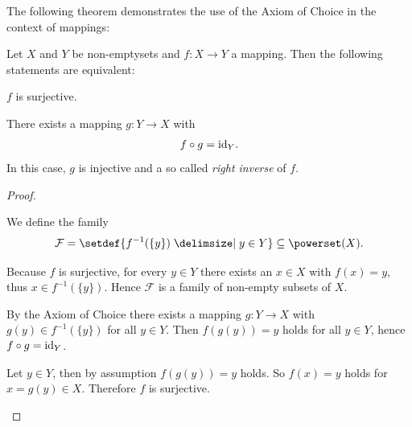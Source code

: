 The following theorem demonstrates the use of the Axiom of Choice in the context of mappings:

\begin{theorem}\label{theorem:mappings:choice_partition}
    Let $X$ and $Y$ be non-emptysets and $f\colon X\rightarrow Y$ a mapping.
    Then the following statements are equivalent:
    \begin{intheoremenumerate}
        \item $f$ is surjective.
        \item There exists a mapping $g\colon Y\rightarrow X$ with \begin{align}f\circ g=\text{id}_Y.\end{align} In this case, $g$ is injective and a so called \emph{right inverse} of $f$.
    \end{intheoremenumerate}
\end{theorem}

\begin{proof}
    \begin{proofenumerate}
         We define the family \begin{align}\mathcal F=\setdef{f^{-1}(\{y\})\given y\in Y}\subseteq\powerset(X).\end{align}
        
         Because $f$ is surjective, for every $y\in Y$ there exists an $x\in X$ with $f(x)=y$, thus $x\in f^{-1}(\{y\})$. Hence $\mathcal F$ is a family of non-empty subsets of $X$.

         By the Axiom of Choice there exists a mapping $g\colon Y\rightarrow X$ with $g(y)\in f^{-1}(\{y\})$ for all $y\in Y$. Then $f(g(y))=y$ holds for all $y\in Y$, hence $f\circ g=\text{id}_Y$.

         Let $y\in Y$, then by assumption $f(g(y))=y$ holds. So $f(x)=y$ holds for $x=g(y)\in X$. Therefore $f$ is surjective.
    \end{proofenumerate}
\end{proof}
